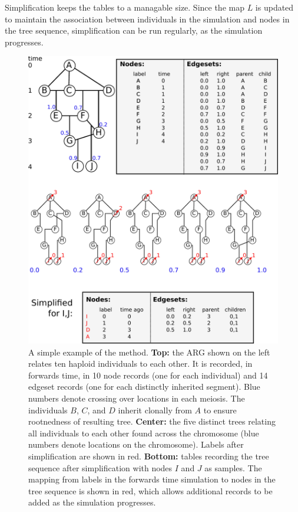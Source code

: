 \documentclass{article}
\begin{document}
Simplification keeps the tables to a managable size.
Since the map $L$ is updated to maintain the association between individuals in the simulation
and nodes in the tree sequence, simplification can be run regularly, 
as the simulation progresses.


\begin{figure}
    \begin{center}
        \includegraphics{method_diagram}
    \end{center}
    \caption{
        A simple example of the method.
        \textbf{Top:} the ARG shown on the left relates ten haploid individuals to each other.
        It is recorded, in forwards time, 
        in 10 node records (one for each individual)
        and 14 edgeset records (one for each distinctly inherited segment).
        Blue numbers denote crossing over locations in each meiosis.
        The individuals $B$, $C$, and $D$ inherit clonally from $A$
        to ensure rootnedness of resulting tree.
        \textbf{Center:} the five distinct trees relating all individuals to each other
        found across the chromosome (blue numbers denote locations on the chromosome).
        Labels after simplification are shown in red.
        \textbf{Bottom:} tables recording the tree sequence after simplification 
        with nodes $I$ and $J$ as samples.
        The mapping from labels in the forwards time simulation to nodes in the tree sequence
        is shown in red,
        which allows additional records to be added as the simulation progresses.
        \label{fig:method_diagram}
    }
\end{figure}
\end{document}
